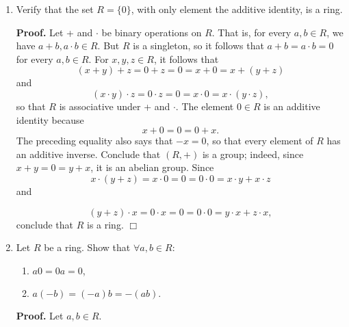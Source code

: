 \documentclass[9pt]{article}
\newcommand{\qed}{\hfill \ensuremath{\Box}}
\begin{document}
\begin{enumerate}
   \item Verify that the set $R = \{0\}$, with only element the additive
         identity, is a ring.

      \textbf{Proof.} Let + and $\cdot$ be binary operations on $R$. That is,
      for every $a, b \in R$, we have $a + b, a \cdot b \in R$. But $R$ is a
      singleton, so it follows that $a + b = a \cdot b = 0$ for every
      $a, b \in R$. For $x, y, z \in R$, it follows that
      $$(x + y) + z = 0 + z = 0 = x + 0 = x + (y + z)$$
      and
      $$(x\cdot y) \cdot z = 0 \cdot z = 0 = x \cdot 0 = x \cdot (y \cdot z),$$
      so that $R$ is associative under + and $\cdot$. The element $0 \in R$ is
      an additive identity because
      $$x + 0 = 0 = 0 + x.$$
      The preceding equality also says that $-x = 0$, so that every element of
      $R$ has an additive inverse. Conclude that $(R, +)$ is a group; indeed,
      since $x + y = 0 = y + x$, it is an abelian group. Since
      $$x \cdot (y + z) = x \cdot 0 = 0 = 0 \cdot 0 = x \cdot y + x \cdot z$$
      and
      
      $$(y + z) \cdot x  = 0 \cdot x = 0 = 0 \cdot 0 = y \cdot x + z \cdot x,$$
      conclude that $R$ is a ring. \qed
   \item Let $R$ be a ring. Show that $\forall a, b \in R$:
         \begin{enumerate}
            \item $a0 = 0a = 0$,
            \item $a(-b) = (-a)b = -(ab).$
         \end{enumerate}
         
      \textbf{Proof.} Let $a, b \in R$.
      

\end{enumerate}
\end{document}
